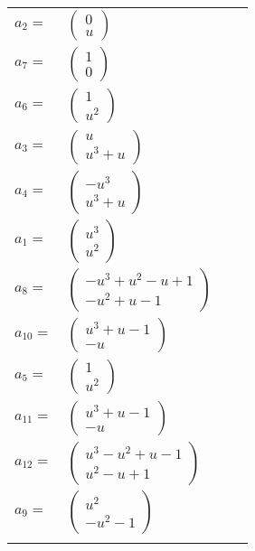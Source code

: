 \documentclass[1p]{elsarticle_modified}
\theoremstyle{definition}
\begin{document}
\begin{tabular}{m{7pt} m{180pt} m{7pt} m{180pt} }
\flushright $a_{2}=$&$\begin{pmatrix}0\\u\end{pmatrix}$ \\
\flushright $a_{7}=$&$\begin{pmatrix}1\\0\end{pmatrix}$ \\
\flushright $a_{6}=$&$\begin{pmatrix}1\\u^2\end{pmatrix}$ \\
\flushright $a_{3}=$&$\begin{pmatrix}u\\u^3+u\end{pmatrix}$ \\
\flushright $a_{4}=$&$\begin{pmatrix}- u^3\\u^3+u\end{pmatrix}$ \\
\flushright $a_{1}=$&$\begin{pmatrix}u^3\\u^2\end{pmatrix}$ \\
\flushright $a_{8}=$&$\begin{pmatrix}- u^3+u^2- u+1\\- u^2+u-1\end{pmatrix}$ \\
\flushright $a_{10}=$&$\begin{pmatrix}u^3+u-1\\- u\end{pmatrix}$ \\
\flushright $a_{5}=$&$\begin{pmatrix}1\\u^2\end{pmatrix}$ \\
\flushright $a_{11}=$&$\begin{pmatrix}u^3+u-1\\- u\end{pmatrix}$ \\
\flushright $a_{12}=$&$\begin{pmatrix}u^3- u^2+u-1\\u^2- u+1\end{pmatrix}$ \\
\flushright $a_{9}=$&$\begin{pmatrix}u^2\\- u^2-1\end{pmatrix}$\\&\end{tabular}
\end{document}

